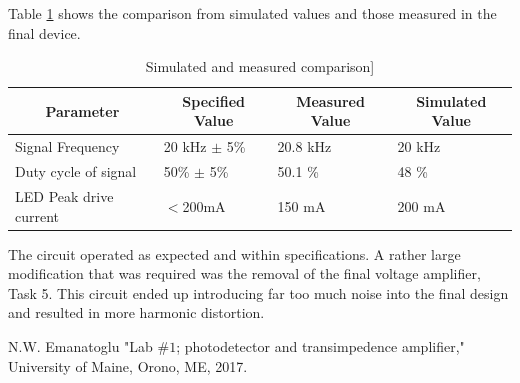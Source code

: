 \documentclass{article}
\begin{document}
Table \ref{tab:simcompare} shows the comparison from simulated values and those measured in the final device.
\begin{table}[H]
	\centering
	\caption{Simulated and measured comparison]}
	\label{tab:simcompare}
	\begin{tabular}{|l|l|l|l|}
		\hline
		\multicolumn{1}{|c|}{\textbf{Parameter}} & \multicolumn{1}{c|}{\textbf{Specified Value}} & \multicolumn{1}{c|}{\textbf{Measured Value}} & \multicolumn{1}{c|}{\textbf{Simulated Value}} \\ \hline
		Signal Frequency                         & 20 kHz $\pm$ 5\%                              & 20.8 kHz                                     & 20 kHz                                        \\ \hline
		Duty cycle of signal                     & 50\% $\pm$ 5\%                                & 50.1 \%                                      & 48 \%                                         \\ \hline
		LED Peak drive current                   & $<$200mA                                      & 150 mA                                       & 200 mA                                        \\ \hline
	\end{tabular}
\end{table}

The circuit operated as expected and within specifications. A rather large modification that was required was the removal of the final voltage amplifier, Task 5. This circuit ended up introducing far too much noise into the final design and resulted in more harmonic distortion.
  
 
    
    \newpage
\clearpage

\appendix

\begin{thebibliography}{00}



 N.W. Emanatoglu "Lab $\#1$; photodetector and transimpedence amplifier," University of Maine, Orono, ME, 2017.
\newline

\newpage


\end{thebibliography}
\end{document}
